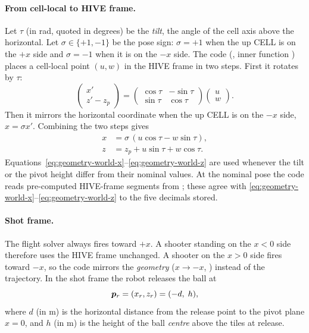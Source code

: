 \paragraph{From cell-local to HIVE frame.} Let $\tau$ (in rad, quoted in degrees) be the
\emph{tilt}, the angle of the cell axis above the horizontal. Let $\sigma \in \{+1, -1\}$ be the
pose sign: $\sigma = +1$ when the up CELL is on the $+x$ side and $\sigma = -1$ when it is on the
$-x$ side. The code (, inner function ) places a cell-local point
$(u, w)$ in the HIVE frame in two steps. First it rotates by $\tau$:
\begin{equation}
  \begin{pmatrix} x' \\ z' - z_p \end{pmatrix}
  =
  \begin{pmatrix} \cos\tau & -\sin\tau \\ \sin\tau & \cos\tau \end{pmatrix}
  \begin{pmatrix} u \\ w \end{pmatrix}.
  \label{eq:geometry-rotation}
\end{equation}
Then it mirrors the horizontal coordinate when the up CELL is on the $-x$ side, $x = \sigma x'$.
Combining the two steps gives
\begin{align}
  x &= \sigma\,(u\cos\tau - w\sin\tau), \label{eq:geometry-world-x}\\
  z &= z_p + u\sin\tau + w\cos\tau. \label{eq:geometry-world-z}
\end{align}
Equations~\eqref{eq:geometry-world-x}--\eqref{eq:geometry-world-z} are used whenever the tilt or the pivot
height differ from their nominal values. At the nominal pose the code reads pre-computed
HIVE-frame segments from ; these agree with
\eqref{eq:geometry-world-x}--\eqref{eq:geometry-world-z} to the five decimals stored.

\paragraph{Shot frame.} The flight solver always fires toward $+x$. A shooter standing on the
$x < 0$ side therefore uses the HIVE frame unchanged. A shooter on the $x > 0$ side fires toward
$-x$, so the code mirrors the \emph{geometry} ($x \to -x$, ) instead of the
trajectory. In the shot frame the robot releases the ball at
\begin{equation}
  \bm{p}_r = (x_r, z_r) = (-d,\; h),
  \label{eq:geometry-release}
\end{equation}
where $d$ (in \unit{m}) is the horizontal distance from the release point to the pivot plane
$x = 0$, and $h$ (in \unit{m}) is the height of the ball \emph{centre} above the tiles at release.

